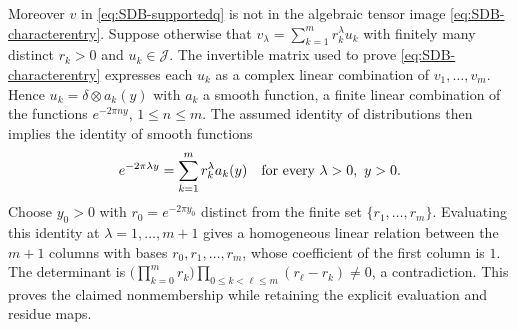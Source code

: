 Moreover $v$ in \eqref{eq:SDB-supportedq} is not in the algebraic
tensor image \eqref{eq:SDB-characterentry}. Suppose otherwise that
$v_\lambda=\sum_{k=1}^m r_k^\lambda u_k$ with finitely many distinct
$r_k>0$ and $u_k\in\mathcal J$. The invertible matrix used to prove
\eqref{eq:SDB-characterentry} expresses each $u_k$ as a complex
linear combination of $v_1,\ldots,v_m$. Hence
$u_k=\delta\otimes a_k(y)$ with $a_k$ a smooth function, a finite
linear combination of the functions $e^{-2\pi n y}$,
$1\leq n\leq m$. The assumed identity of distributions then
implies the identity of smooth functions
\[
 e^{-2\pi\lambda y}=\sum_{k=1}^m r_k^\lambda a_k(y)
       \quad\hbox{for every }\lambda>0,\ y>0.
\]
Choose $y_0>0$ with $r_0=e^{-2\pi y_0}$ distinct from the finite
set $\{r_1,\ldots,r_m\}$. Evaluating this identity at
$\lambda=1,\ldots,m+1$ gives a homogeneous linear relation
between the $m+1$ columns with bases $r_0,r_1,\ldots,r_m$,
whose coefficient of the first column is $1$.
The determinant is
$\bigl(\prod_{k=0}^m r_k\bigr)
 \prod_{0\leq k<\ell\leq m}(r_\ell-r_k)\ne0$,
a contradiction. This proves the claimed nonmembership while
retaining the explicit evaluation and residue maps.

